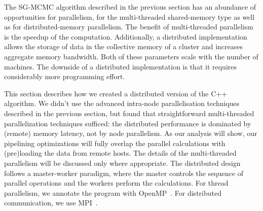 \begin{comment}
- pi storage: DKV
   . pi/phi is read in 3), 4), 5a), 7)
   . pi is written in 4); read[i], then write[i], so no other data dependencies
   . so access is very synchronous: either read-only, or write without
     concurrent readers
   . DKV store properties:
      - single-sized keys
      - contiguous key space (integers 0..N-1)
      - update-only writes: no new KVs, no deletes
     so: no load imbalance, no hashing that is worth its name
      - no read/write or write/write concurrency
     so:
      - build RDMA store with remote reads and remote writes only, with exactly
        one RDMA transaction per read or write
\end{comment}



The SG-MCMC algorithm described in the previous section has an abundance of
opportunities for parallelism, for the multi-threaded shared-memory type as
well as for distributed-memory parallelism. The benefit of multi-threaded
parallelism is the speedup of the computation. Additionally, a distributed implementation
allows the storage of data in the collective memory of a cluster
and increases aggregate memory bandwidth. Both of these parameters scale with the number of
machines. The downside of a distributed implementation is that it requires
considerably more programming effort.


This section describes how we created a distributed version of the C++
algorithm. We didn't use the advanced intra-node parallelisation techniques
described in the previous section, but found that straightforward
multi-threaded parallelization techniques sufficed: the distributed performance
is dominated by (remote) memory latency, not by node parallelism. As our
analysis will show, our pipelining optimizations will fully overlap the
parallel calculations with (pre)loading the data from remote hosts.
The details of the multi-threaded parallelism
will be discussed only where appropriate. The
distributed design follows a master-worker paradigm, where
the master controls the sequence of parallel operations and the workers perform the
calculations. For thread parallelism, we annotate the program with
OpenMP~\cite{OpenMPSpec}. For distributed communication, we use
MPI~\cite{Forum:1994:MMI:898758}.


